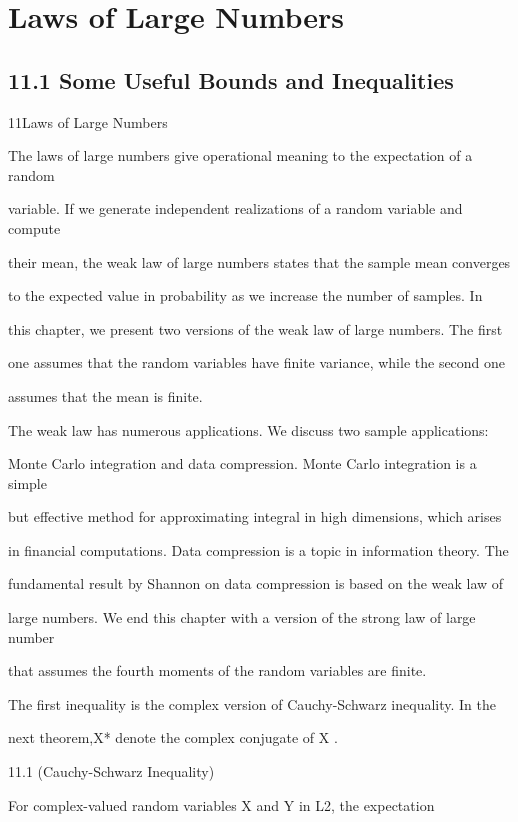 \section*{Laws of Large Numbers}

\subsection*{11.1 Some Useful Bounds and Inequalities}

11Laws of Large Numbers

The laws of large numbers give operational meaning to the expectation of a random

variable. If we generate independent realizations of a random variable and compute

their mean, the weak law of large numbers states that the sample mean converges

to the expected value in probability as we increase the number of samples. In

this chapter, we present two versions of the weak law of large numbers. The first

one assumes that the random variables have finite variance, while the second one

assumes that the mean is finite.

The weak law has numerous applications. We discuss two sample applications:

Monte Carlo integration and data compression. Monte Carlo integration is a simple

but effective method for approximating integral in high dimensions, which arises

in financial computations. Data compression is a topic in information theory. The

fundamental result by Shannon on data compression is based on the weak law of

large numbers. We end this chapter with a version of the strong law of large number

that assumes the fourth moments of the random variables are finite.

The first inequality is the complex version of Cauchy-Schwarz inequality. In the

next theorem,X* denote the complex conjugate of X .

\begin{thmbox}{11.1 (Cauchy-Schwarz Inequality)}
\end{thmbox}

For complex-valued random variables X and Y in L2, the expectation


